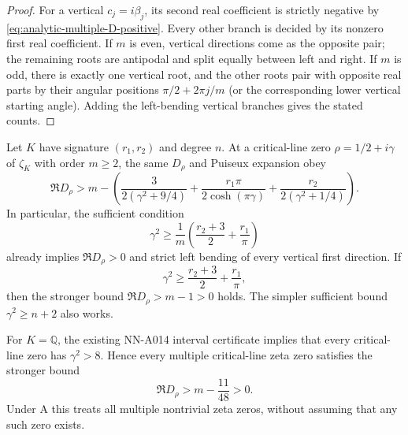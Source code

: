 \begin{proof}
For a vertical $c_j=i\beta_j$, its second real coefficient
is strictly negative by \eqref{eq:analytic-multiple-D-positive}.
Every other branch is decided by its nonzero first real
coefficient. If $m$ is even, vertical directions come as the
opposite pair; the remaining roots are antipodal and split
equally between left and right. If $m$ is odd, there is exactly
one vertical root, and the other roots pair with opposite
real parts by their angular positions $\pi/2+2\pi j/m$ (or
the corresponding lower vertical starting angle). Adding
the left-bending vertical branches gives the stated counts.
\end{proof}

\begin{corollary}
\label{cor:analytic-multiple-dedekind-bending}
Let $K$ have signature $(r_1,r_2)$ and degree $n$. At a
critical-line zero $\rho=1/2+i\gamma$ of $\zeta_K$ with
order $m\ge2$, the same $D_\rho$ and Puiseux expansion obey
\begin{equation}\label{eq:analytic-dedekind-D-lower}
 \Re D_\rho>m-
 \left(\frac{3}{2(\gamma^2+9/4)}
       +\frac{r_1\pi}{2\cosh(\pi\gamma)}
       +\frac{r_2}{2(\gamma^2+1/4)}\right).
\end{equation}
In particular, the sufficient condition
\[
 \gamma^2\ge\frac1m
       \left(\frac{r_2+3}{2}+\frac{r_1}{\pi}\right)
\]
already implies $\Re D_\rho>0$ and strict left bending of
every vertical first direction. If
\[
 \gamma^2\ge\frac{r_2+3}{2}+\frac{r_1}{\pi},
\]
then the stronger bound $\Re D_\rho>m-1>0$ holds. The simpler sufficient bound
$\gamma^2\ge n+2$ also works.

For $K=\mathbb Q$, the existing NN-A014 interval certificate
implies that every critical-line zero has $\gamma^2>8$.
Hence every multiple critical-line zeta zero satisfies the
stronger bound
\[
                    \Re D_\rho>m-\frac{11}{48}>0.
\]
Under A this treats all multiple nontrivial zeta zeros, without
assuming that any such zero exists.
\end{corollary}

